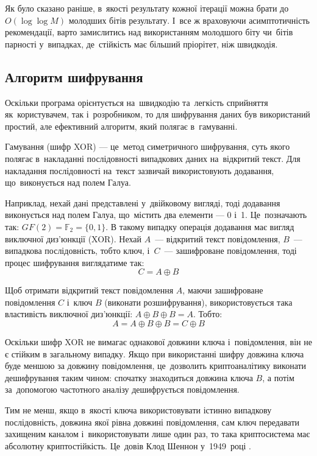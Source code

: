 \documentclass[a4paper,oneside,titlepage,14pt]{extarticle}
\begin{document}
				Як було сказано раніше, в~якості результату кожної ітерації можна брати до~$O(\log{\log{M}})$ молодших бітів результату. І~все ж враховуючи асимптотичність рекомендації, варто замислитись над використанням молодшого біту чи~бітів парності у~випадках, де~стійкість має більший пріорітет, ніж швидкодія.\par
			\subsection{Алгоритм шифрування}
				Оскільки програма орієнтується на~швидкодію та~легкість сприйняття як~користувачем, так і~розробником, то для шифрування даних був використаний простий, але ефективний алгоритм, який полягає в~гамуванні.\par
				Гамування (шифр XOR) --- це~метод симетричного шифрування, суть якого полягає в~накладанні послідовності випадкових даних на~відкритий текст. Для накладання послідовності на~текст зазвичай використовують додавання, що~виконується над полем Галуа.\par
				Наприклад, нехай дані представлені у~двійковому вигляді, тоді додавання виконується над полем Галуа, що~містить два елементи --- 0 і~1. Це~позначають так: $GF(2) = \mathbb{F}_2 = \{0,1\}$. В такому випадку операція додавання має вигляд виключної диз'юнкції (XOR). Нехай $A$~--- відкритий текст повідомлення, $B$~--- випадкова послідовність, тобто ключ, і~$C$~--- зашифроване повідомлення, тоді процес шифрування виглядатиме так:
				\[
					C = A \oplus B
				\]
				\par
				Щоб отримати відкритий текст повідомлення $A$, маючи зашифроване повідомлення $C$ і~ключ $B$ (виконати розшифрування), використовується така властивість виключної диз'юнкції: $A \oplus B \oplus B = A$. Тобто:
				\[
					A = A \oplus B \oplus B = C \oplus B
				\]
				\par
				Оскільки шифр XOR не вимагає однакової довжини ключа і~повідомлення, він не є стійким в загальному випадку. Якщо при використанні шифру довжина ключа буде меншою за довжину повідомлення, це~дозволить криптоаналітику виконати дешифрування таким чином: спочатку знаходиться довжина ключа $B$, а потім за~допомогою частотного аналізу дешифрується повідомлення.\par
				Тим не менш, якщо в~якості ключа використовувати істинно випадкову послідовність, довжина якої рівна довжині повідомлення, сам ключ передавати захищеним каналом і~використовувати лише один раз, то така криптосистема має абсолютну криптостійкість. Це~довів Клод Шеннон у~1949~році \cite{shannonproofvernam}.\par
\end{document}
